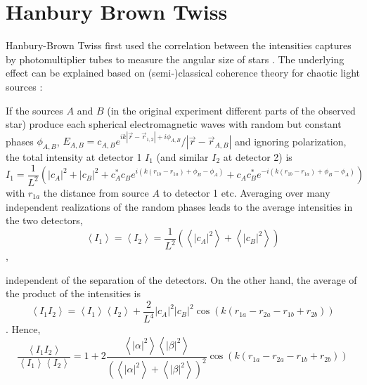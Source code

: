 \section{Hanbury Brown Twiss}
Hanbury-Brown Twiss first used the correlation between the intensities captures by photomultiplier tubes to measure the angular size of stars  \cite{hanbury1956}. The underlying effect can be explained based on (semi-)classical coherence theory for chaotic light sources \cite{baym1997,goodman2000}:

If the sources $A$ and $B$ (in the original experiment different parts of the observed star) produce each spherical electromagnetic waves with random but constant phases $\phi_{A,B}$, $E_{A,B}=c_{A,B} e^{i k\left|\vec{r}-\vec{r}_{1,2}\right|+i \phi_{A,B}} /\left|\vec{r}-\vec{r}_{A,B}\right|$ and ignoring polarization, the total intensity at detector 1 $I_{1}$ (and similar $I_{2}$ at detector 2) is
\begin{equation}
	I_{1} =
	\frac{1}{L^{2}}\left(
	|c_A|^{2}
	+|c_B|^{2}
	+c_A^{*} c_B     e^{ i\left(k\left(r_{1 b}-r_{1 a}\right)+\phi_{B}-\phi_{A}\right)}
	+c_A     c_B^{*} e^{-i\left(k\left(r_{1 b}-r_{1 a}\right)+\phi_{B}-\phi_{A}\right)}
	\right)
\end{equation}
with $r_{1 a}$ the distance from source $A$ to detector 1 etc. 
Averaging over many independent realizations of the random phases leads to the average intensities in the two detectors,
\begin{equation}
	\left\langle I_{1}\right\rangle=\left\langle I_{2}\right\rangle=\frac{1}{L^{2}}\left(\left\langle|c_A|^{2}\right\rangle+\left\langle|c_B|^{2}\right\rangle\right)
\end{equation}, 

independent of the separation of the detectors. On the other hand, the average of the product of the intensities is
\begin{equation}
	\left\langle I_{1} I_{2}\right\rangle =
	\left\langle I_{1}\right\rangle\left\langle I_{2}\right\rangle+\frac{2}{L^{4}}|c_A|^{2}|c_B|^{2} \cos \left(k\left(r_{1 a}-r_{2 a}-r_{1 b}+r_{2 b}\right)\right) 
\end{equation}.
Hence,
\begin{equation}
	\frac{\left\langle I_{1} I_{2}\right\rangle}{\left\langle I_{1}\right\rangle\left\langle I_{2}\right\rangle}
	=1+2 \frac{\left\langle|\alpha|^{2}\right\rangle\left\langle|\beta|^{2}\right\rangle}{\left(\left\langle|\alpha|^{2}\right\rangle+\left\langle|\beta|^{2}\right\rangle\right)^{2}} \cos \left(k\left(r_{1 a}-r_{2 a}-r_{1 b}+r_{2 b}\right)\right)
\end{equation}

